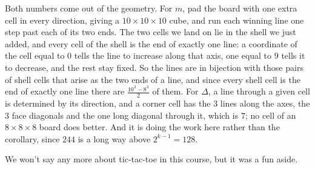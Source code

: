 Both numbers come out of the geometry. For $m$, pad the board with one extra cell in every direction, giving a $10 \times 10 \times 10$ cube, and run each winning line one step past each of its two ends. The two cells we land on lie in the shell we just added, and every cell of the shell is the end of exactly one line: a coordinate of the cell equal to $0$ tells the line to increase along that axis, one equal to $9$ tells it to decrease, and the rest stay fixed. So the lines are in bijection with those pairs of shell cells that arise as the two ends of a line, and since every shell cell is the end of exactly one line there are $\frac{10^3 - 8^3}{2}$ of them. For $\Delta$, a line through a given cell is determined by its direction, and a corner cell has the $3$ lines along the axes, the $3$ face diagonals and the one long diagonal through it, which is $7$; no cell of an $8 \times 8 \times 8$ board does better. And it is  doing the work here rather than the corollary, since $244$ is a long way above $2^{k - 1} = 128$.

We won't say any more about tic-tac-toe in this course, but it was a fun aside.
